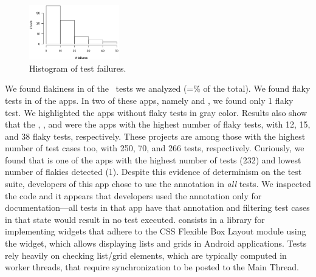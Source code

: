 \documentclass[conference]{IEEEtran}
\begin{document}
\begin{figure}[t!]
    \centering
    \includegraphics[trim=0 0 10 50,clip,width=0.35\textwidth,height=0.22\textwidth]{figs/histogram.eps}
    \vspace{-2ex}
    \caption{Histogram of test failures.}
    \label{fig:histogram-testfailures}
    \vspace{-3ex}
\end{figure}

We found flakiness in \numflakytestsds{} of the \totalTests\ tests we analyzed (=\percFlakyTestSds{}\% of the total). We found flaky tests in \numprojectsWithFlakies{} of the \numprojects{} apps. In two of these apps, namely  and , we found only 1 flaky test. We highlighted the apps without flaky tests in gray color. Results also show that the , , and  were the apps with the highest number of flaky tests, with 12, 15, and 38 flaky tests, respectively. These projects are among those with the highest number of test cases too, with 250, 70, and 266 tests, respectively. Curiously, we found that  is one of the apps with the highest number of tests (232) and lowest number of flakies detected (1). Despite this evidence of determinism on the test suite, developers of this app chose to use the annotation  in \emph{all} tests. We inspected the code and it appears that developers used the annotation only for documentation---all tests in that app have that annotation and filtering test cases in that state would result in no test executed.
 consists in a library for implementing widgets that adhere to the CSS Flexible Box Layout module using the  widget, which allows displaying lists and grids in Android applications. Tests rely heavily on checking list/grid elements, which are typically computed in worker threads, that require synchronization to be posted to the Main Thread. 
\end{document}
